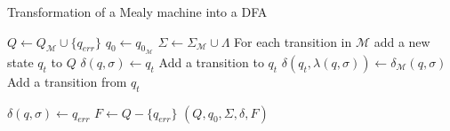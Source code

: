 \begin{algorithm}[h]
\caption{Transformation of a Mealy machine into a DFA}
\label{alg:transform_hungar}
\begin{algorithmic}[1]
  \State $Q \gets Q_\mathcal{M} \cup \{q_{err}\}$
  \State $q_0 \gets q_{0_\mathcal{M}}$
  \State $\Sigma \gets \Sigma_\mathcal{M} \cup \Lambda$
  \Comment For each transition in $\mathcal{M}$
    \State add a new state $q_t$ to $Q$
    \State $\delta(q,\sigma) \gets q_t$
    \Comment Add a transition to $q_t$
    \State $\delta(q_t, \lambda(q,\sigma)) \gets \delta_\mathcal{M}(q, \sigma)$
    \Comment Add a transition from $q_t$
  \EndFor

      \State $\delta(q, \sigma) \gets q_{err}$
    \EndIf
  \EndFor
  \State $F \gets Q - \{q_{err}\}$
  \State \Return $(Q, q_0, \Sigma, \delta, F)$
\EndFunction{}
\end{algorithmic}
\end{algorithm}

